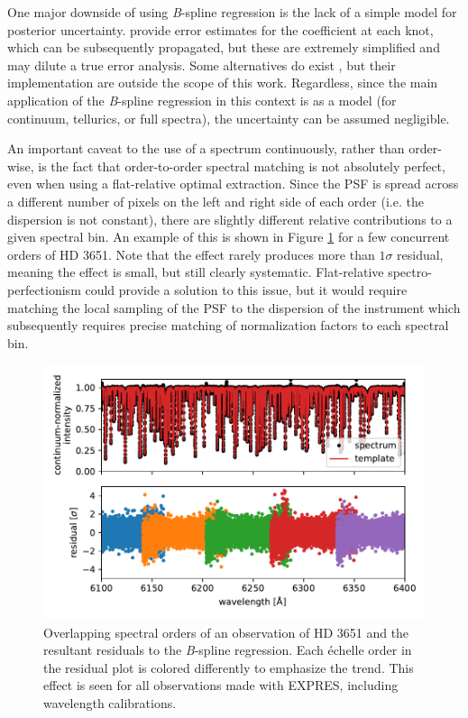 One major downside of using \textit{B}-spline regression is the lack of a simple model for posterior uncertainty. \citet{zechmeister_spectrum_2018} provide error estimates for the coefficient at each knot, which can be subsequently propagated, but these are extremely simplified and may dilute a true error analysis. Some alternatives do exist \citep{enting_propagating_2006, gardner_uncertainties_2003}, but their implementation are outside the scope of this work. Regardless, since the main application of the \textit{B}-spline regression in this context is as a model (for continuum, tellurics, or full spectra), the uncertainty can be assumed negligible.

An important caveat to the use of a spectrum continuously, rather than order-wise, is the fact that order-to-order spectral matching is not absolutely perfect, even when using a flat-relative optimal extraction. Since the PSF is spread across a different number of pixels on the left and right side of each order (i.e. the dispersion is not constant), there are slightly different relative contributions to a given spectral bin. An example of this is shown in Figure \ref{fig:order-matching} for a few concurrent orders of HD 3651. Note that the effect rarely produces more than $1\sigma$ residual, meaning the effect is small, but still clearly systematic. Flat-relative spectro-perfectionism could provide a solution to this issue, but it would require matching the local sampling of the PSF to the dispersion of the instrument which subsequently requires precise matching of normalization factors to each spectral bin.

\begin{figure}
    \centering
    \includegraphics{figures-5/order-matching.pdf}
    \caption[Stellar template overlapping orders]{Overlapping spectral orders of an observation of HD 3651 and the resultant residuals to the \textit{B}-spline regression. Each \'{e}chelle order in the residual plot is colored differently to emphasize the trend. This effect is seen for all observations made with EXPRES, including wavelength calibrations.}
    \label{fig:order-matching}
\end{figure}


